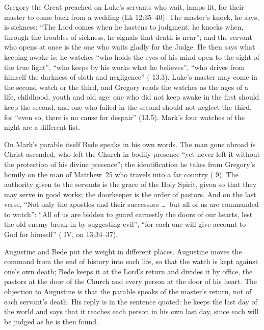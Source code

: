 Gregory the Great preached on Luke's servants who wait, lamps lit, for their
master to come back from a wedding (Lk 12:35--40). The master's knock, he
says, is sickness: ``The Lord comes when he hastens to judgment; he knocks
when, through the troubles of sickness, he signals that death is near''; and
the servant who opens at once is the one who waits gladly for the Judge. He
then says what keeping awake is: he watches ``who holds the eyes of his mind
open to the sight of the true light'', ``who keeps by his works what he
believes'', ``who drives from himself the darkness of sloth and negligence''
( 13.3). Luke's master may come in the second
watch or the third, and Gregory reads the watches as the ages of a life,
childhood, youth and old age: one who did not keep awake in the first should
keep the second, and one who failed in the second should not neglect the
third, for ``even so, there is no cause for despair'' (13.5). Mark's four watches of the night are a different list.

On Mark's parable itself Bede speaks in his own words. The man gone abroad is
Christ ascended, who left the Church in bodily presence ``yet never left it
without the protection of his divine presence''; the identification he takes
from Gregory's homily on the man of Matthew~25 who travels into a far country
( 9).
The authority given to the servants is the grace of the Holy Spirit, given so
that they may serve in good works; the doorkeeper is the order of pastors.
And on the last verse, ``Not only the apostles and their successors \ldots\ but
all of us are commanded to watch'': ``All of us are bidden to guard earnestly
the doors of our hearts, lest the old enemy break in by suggesting evil'',
``for each one will give account to God for himself'' ( IV, on 13:34--37).

Augustine and Bede put the weight in different places. Augustine moves the
command from the end of history into each life, so that the watch is kept
against one's own death; Bede keeps it at the Lord's return and divides it by
office, the pastors at the door of the Church and every person at the door of
his heart. The objection to Augustine is that the parable speaks of the
master's return, not of each servant's death. His reply is in the sentence
quoted: he keeps the last day of the world and says that it reaches each
person in his own last day, since each will be judged as he is then found.

